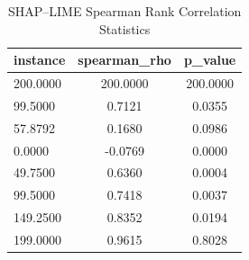 \begin{table}
\centering
\caption{SHAP–LIME Spearman Rank Correlation Statistics}
\label{tab:agreement}
\begin{tabular}{lcc}
\toprule
instance & spearman_rho & p_value \\
\midrule
200.0000 & 200.0000 & 200.0000 \\
99.5000 & 0.7121 & 0.0355 \\
57.8792 & 0.1680 & 0.0986 \\
0.0000 & -0.0769 & 0.0000 \\
49.7500 & 0.6360 & 0.0004 \\
99.5000 & 0.7418 & 0.0037 \\
149.2500 & 0.8352 & 0.0194 \\
199.0000 & 0.9615 & 0.8028 \\
\bottomrule
\end{tabular}
\end{table}
